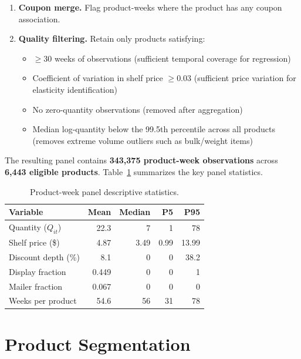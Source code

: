 \documentclass[12pt,a4paper]{article}
\begin{document}
\begin{enumerate}
\item \textbf{Coupon merge.} Flag product-weeks where the product
has any coupon association.

\item \textbf{Quality filtering.} Retain only products satisfying:
\begin{itemize}[nosep]
\item $\geq 30$ weeks of observations (sufficient temporal coverage
for regression)
\item Coefficient of variation in shelf price $\geq 0.03$ (sufficient
price variation for elasticity identification)
\item No zero-quantity observations (removed after aggregation)
\item Median log-quantity below the 99.5th percentile across all
products (removes extreme volume outliers such as bulk/weight items)
\end{itemize}
\end{enumerate}

The resulting panel contains \textbf{343,375 product-week
observations} across \textbf{6,443 eligible products}.
Table~\ref{tab:panel-stats} summarizes the key panel statistics.

\begin{table}[H]
\centering
\caption{Product-week panel descriptive statistics.}
\label{tab:panel-stats}
\begin{tabular}{l rrrr}
\toprule
\textbf{Variable} & \textbf{Mean} & \textbf{Median} &
\textbf{P5} & \textbf{P95} \\
\midrule
Quantity ($Q_{it}$) & 22.3 & 7 & 1 & 78 \\
Shelf price (\$) & 4.87 & 3.49 & 0.99 & 13.99 \\
Discount depth (\%) & 8.1 & 0 & 0 & 38.2 \\
Display fraction & 0.449 & 0 & 0 & 1 \\
Mailer fraction & 0.067 & 0 & 0 & 0 \\
Weeks per product & 54.6 & 56 & 31 & 78 \\
\bottomrule
\end{tabular}
\end{table}

\section{Product Segmentation}
\label{sec:segmentation}
\end{document}
